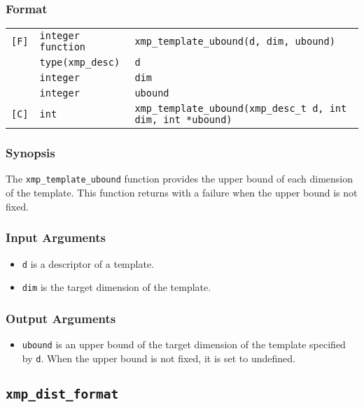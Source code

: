 \subsubsection*{Format}

\begin{tabular}{lll}

\verb![F]!& {\tt integer function}& {\tt xmp\_template\_ubound(d, dim, ubound)}\\
          & {\tt type(xmp\_desc)} & {\tt d}\\
          & {\tt integer} & {\tt dim}\\
          & {\tt integer} & {\tt ubound}\\

\verb![C]!&  {\tt int}& {\tt xmp\_template\_ubound(xmp\_desc\_t d, int dim, int *ubound)}\\

\end{tabular}

\subsubsection*{Synopsis}

The {\tt xmp\_template\_ubound} function provides the upper bound of each
dimension of the template. This function returns with a failure when the
upper bound is not fixed.

\subsubsection*{Input Arguments}
\begin{itemize}
 \item {\tt d} is a descriptor of a template.
 \item {\tt dim} is the target dimension of the template.
\end{itemize}

\subsubsection*{Output Arguments}
\begin{itemize}
 \item {\tt ubound} is an upper bound of the target dimension of the
       template specified by {\tt d}. When the upper bound is not fixed,
       it is set to undefined.
\end{itemize}


\subsection{\tt xmp\_dist\_format}

